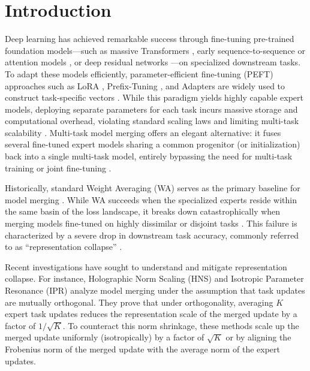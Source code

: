 \documentclass{article}
\theoremstyle{plain}
\theoremstyle{definition}
\theoremstyle{remark}
\begin{document}
\printAffiliationsAndNotice{} %

\section{Introduction}
\label{submission:intro}

Deep learning has achieved remarkable success through fine-tuning pre-trained foundation models—such as massive Transformers \cite{vaswani2017attention, devlin2018bert, brown2020language}, early sequence-to-sequence or attention models \cite{sutskever2014sequence, bahdanau2014neural}, or deep residual networks \cite{he2016deep, radford2021learning}—on specialized downstream tasks. 
To adapt these models efficiently, parameter-efficient fine-tuning (PEFT) approaches such as LoRA \cite{hu2021lora}, Prefix-Tuning \cite{li2021prefix}, and Adapters \cite{houlsby2019parameter} are widely used to construct task-specific vectors \cite{ilharco2022editing}. 
While this paradigm yields highly capable expert models, deploying separate parameters for each task incurs massive storage and computational overhead, violating standard scaling laws \cite{kaplan2020scaling} and limiting multi-task scalability \cite{caruana1997multitask, shazeer2017outrageously}. 
Multi-task model merging offers an elegant alternative: it fuses several fine-tuned expert models sharing a common progenitor (or initialization) back into a single multi-task model, entirely bypassing the need for multi-task training or joint fine-tuning \cite{wortsman2022model, ainsworth2023git}.

Historically, standard Weight Averaging (WA) serves as the primary baseline for model merging \cite{izmailov2018averaging, wortsman2022model}. 
While WA succeeds when the specialized experts reside within the same basin of the loss landscape, it breaks down catastrophically when merging models fine-tuned on highly dissimilar or disjoint tasks \cite{yadav2023ties}. 
This failure is characterized by a severe drop in downstream task accuracy, commonly referred to as ``representation collapse'' \cite{sub9_ipr, sub7_hns}.

Recent investigations have sought to understand and mitigate representation collapse. 
For instance, Holographic Norm Scaling (HNS) \cite{sub7_hns} and Isotropic Parameter Resonance (IPR) \cite{sub9_ipr} analyze model merging under the assumption that task updates are mutually orthogonal. 
They prove that under orthogonality, averaging $K$ expert task updates reduces the representation scale of the merged update by a factor of $1/\sqrt{K}$. 
To counteract this norm shrinkage, these methods scale up the merged update uniformly (isotropically) by a factor of $\sqrt{K}$ or by aligning the Frobenius norm of the merged update with the average norm of the expert updates.
\end{document}
